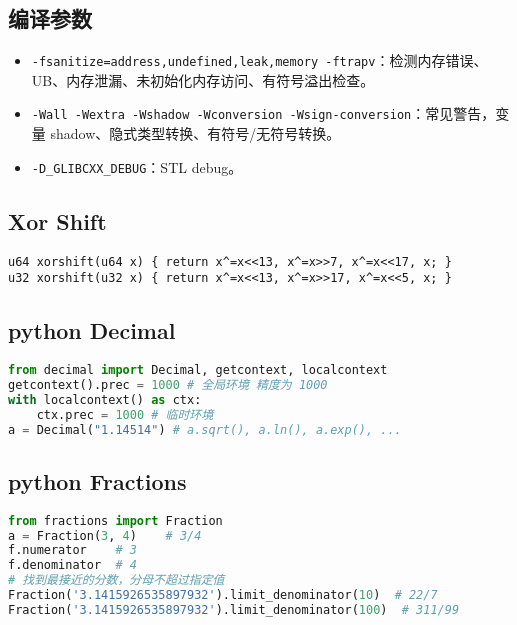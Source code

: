 \documentclass[a4paper,landscape,twocolumn]{ctexart}
\begin{document}
\subsection{编译参数}

\begin{itemize}
\item \texttt{-fsanitize=address,undefined,leak,memory -ftrapv}：检测内存错误、UB、内存泄漏、未初始化内存访问、有符号溢出检查。
\item \texttt{-Wall -Wextra -Wshadow -Wconversion -Wsign-conversion}：常见警告，变量 shadow、隐式类型转换、有符号/无符号转换。
\item \texttt{-D\_GLIBCXX\_DEBUG}：STL debug。
\end{itemize}

\subsection{Xor \space Shift}

\begin{lstlisting}
u64 xorshift(u64 x) { return x^=x<<13, x^=x>>7, x^=x<<17, x; }
u32 xorshift(u32 x) { return x^=x<<13, x^=x>>17, x^=x<<5, x; }
\end{lstlisting}

\subsection{python Decimal}

\begin{lstlisting}[language=python]
from decimal import Decimal, getcontext, localcontext
getcontext().prec = 1000 # 全局环境 精度为 1000
with localcontext() as ctx:
	ctx.prec = 1000 # 临时环境
a = Decimal("1.14514") # a.sqrt(), a.ln(), a.exp(), ...
\end{lstlisting}

\subsection{python Fractions}

\begin{lstlisting}[language=python]
from fractions import Fraction
a = Fraction(3, 4)    # 3/4
f.numerator    # 3
f.denominator  # 4
# 找到最接近的分数，分母不超过指定值
Fraction('3.1415926535897932').limit_denominator(10)  # 22/7
Fraction('3.1415926535897932').limit_denominator(100)  # 311/99
\end{lstlisting}
\end{document}
